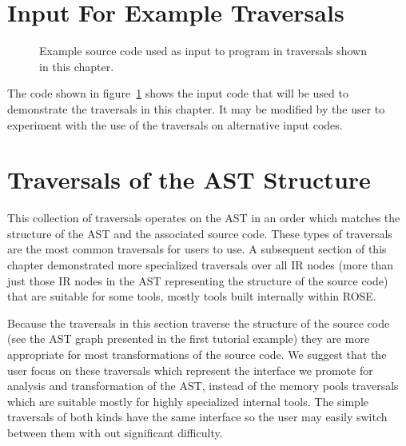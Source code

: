 \section{Input For Example Traversals}
\label{Tutorial:exampleInputCodeDescription}

\begin{figure}[!h]
{\indent
{\mySmallFontSize

\begin{latexonly}
   
\end{latexonly}

\begin{htmlonly}
   
\end{htmlonly}

}
}
\caption{Example source code used as input to program in
         traversals shown in this chapter.}
\label{Tutorial:exampleInputCode_ExampleTraversals}
\end{figure}

   The code shown in figure~\ref{Tutorial:exampleInputCode_ExampleTraversals}
shows the input code that will be used to demonstrate the traversals in this 
chapter.  It may be modified by the user to experiment with the use of the traversals
on alternative input codes.


\section{Traversals of the AST Structure}
\label{Tutorial:astStructureTraversals}

    This collection of traversals operates on the AST in an order
which matches the structure of the AST and the associated source code.
These types of traversals are the most common traversals for users
to use.  A subsequent section of this chapter demonstrated more
specialized traversals over all IR nodes (more than just those IR nodes
in the AST representing the structure of the source code) that are 
suitable for some tools, mostly tools built internally within ROSE.

   Because the traversals in this section traverse the structure of
the source code (see the AST graph presented in the first tutorial 
example) they are more appropriate for most transformations
of the source code.  We suggest that the user focus on these 
traversals which represent the interface we promote for analysis
and transformation of the AST, instead of the memory pools traversals
which are suitable mostly for highly specialized internal tools.
The simple traversals of both kinds have the same interface so the user may
easily switch between them with out significant difficulty.

